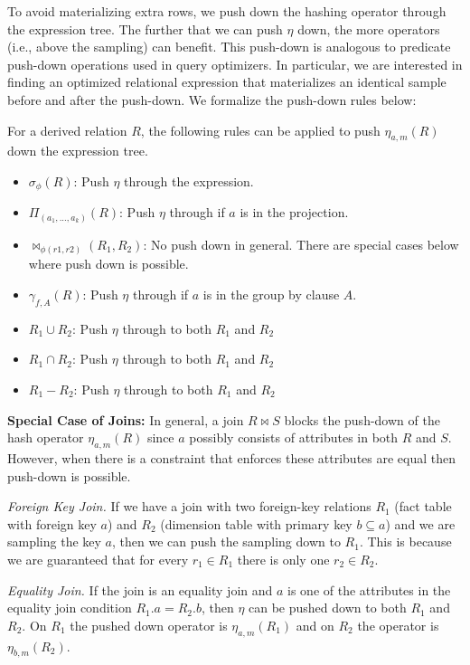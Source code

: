 To avoid materializing extra rows, we push down the hashing operator through the expression tree.
The further that we can push $\eta$ down, the more operators (i.e., above the sampling) can benefit.
This push-down is analogous to predicate push-down operations used in query optimizers. 
In particular, we are interested in finding an optimized relational expression that materializes an identical sample before and after the push-down.
We formalize the push-down rules below:
\begin{definition}
For a derived relation $R$, the following rules can be applied to push $\eta_{a, m}(R)$ down the expression tree. 
\begin{itemize}[noitemsep]
\item $\sigma_{\phi}(R)$: Push $\eta$ through the expression.  
\item $\Pi_{(a_1,...,a_k)}(R)$: Push $\eta $ through if $a$ is in the projection.
\item $\bowtie_{\phi (r1,r2)}(R_1,R_2)$: No push down in general. There are special cases below where push down is possible.
\item $\gamma_{f,A}(R)$: Push $\eta $ through if $a$ is in the group by clause $A$.
\item $R_1 \cup R_2$: Push $\eta $ through to both $R_1$ and $R_2$
\item $R_1 \cap R_2$: Push $\eta $ through to both $R_1$ and $R_2$
\item $R_1 - R_2$: Push $\eta $ through to both $R_1$ and $R_2$
\end{itemize}
\end{definition}

\noindent \textbf{Special Case of Joins: }
In general, a join $R \bowtie S$ blocks the push-down of the hash operator $\eta_{a, m}(R)$ since $a$ possibly consists of attributes in both $R$ and $S$.
However, when there is a constraint that enforces these attributes are equal then push-down is possible.

\emph{Foreign Key Join. } If we have a join with two foreign-key relations $R_1$ (fact table with foreign key $a$) and $R_2$ (dimension table with primary key $b \subseteq a$) and we are sampling the key $a$, then we can push the sampling down to $R_1$. This is because we are guaranteed that for every $r_1\in R_1$ there is only one $r_2 \in R_2$. 

\emph{Equality Join. } If the join is an equality join and $a$ is one of the attributes in the equality join condition $R_1.a = R_2.b$, then $\eta$ can be pushed down to both $R_1$ and $R_2$. On $R_1$ the pushed down operator is $\eta_{a, m}(R_1)$ and on $R_2$ the operator is $\eta_{b, m}(R_2)$. 

